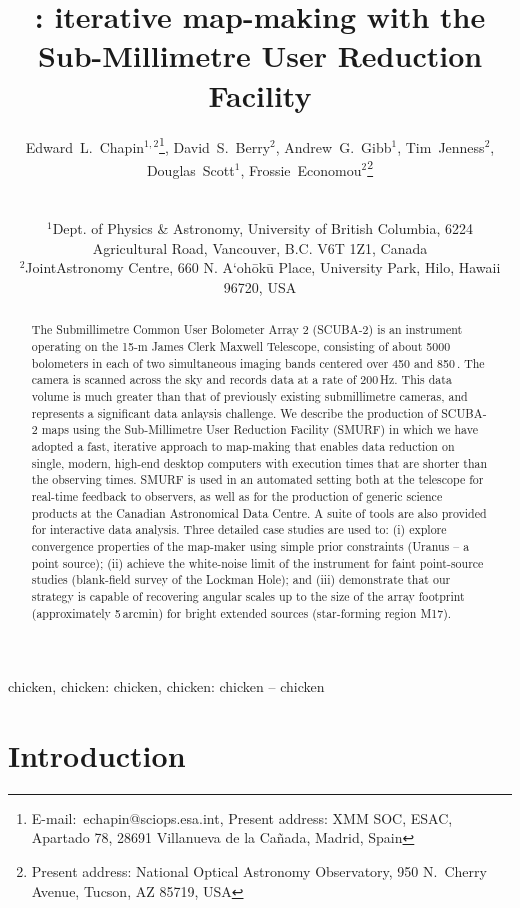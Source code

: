 \documentclass[useAMS,usenatbib,nofootinbib]{mn2e}
\title[\scuba: iterative map-making with SMURF]{\scuba: iterative map-making
with the Sub-Millimetre User Reduction Facility}
\author[Edward~L.~Chapin~et~al.]{
  \parbox[t]{\textwidth}{
    Edward~L.~Chapin$^{1,2}$\thanks{E-mail:~echapin@sciops.esa.int,
      Present address: XMM SOC, ESAC, Apartado 78, 28691 Villanueva de
      la Ca\~nada, Madrid, Spain},
    David~S.~Berry$^{2}$,
    Andrew~G.~Gibb$^{1}$,
    Tim~Jenness$^{2}$,
    Douglas~Scott$^{1}$,
    Frossie~Economou$^2$\thanks{Present address: National Optical
      Astronomy Observatory, 950 N.\ Cherry Avenue, Tucson, AZ 85719, USA}
  }
  \\
  \\
  $^{1}$Dept. of Physics \& Astronomy, University of British Columbia,
  6224 Agricultural Road, Vancouver, B.C. V6T 1Z1, Canada\\
  $^{2}$JointAstronomy Centre, 660 N. A`oh\={o}k\={u} Place, University
  Park, Hilo, Hawaii 96720, USA}
\newcommand{\scuba}{SCUBA-2}
\begin{document}
\label{firstpage}

\maketitle

\begin{abstract}
  The Submillimetre Common User Bolometer Array 2 (\scuba) is an
  instrument operating on the 15-m James Clerk Maxwell Telescope,
  consisting of about 5000 bolometers in each of two simultaneous
  imaging bands centered over 450 and 850\,\micron. The camera is
  scanned across the sky and records data at a rate of 200\,Hz. This
  data volume is much greater than that of previously existing
  submillimetre cameras, and represents a significant data anlaysis
  challenge. We describe the production of SCUBA-2 maps using the
  Sub-Millimetre User Reduction Facility (SMURF) in which we have
  adopted a fast, iterative approach to map-making that enables data
  reduction on single, modern, high-end desktop computers with
  execution times that are shorter than the observing times.  SMURF is
  used in an automated setting both at the telescope for real-time
  feedback to observers, as well as for the production of generic
  science products at the Canadian Astronomical Data Centre. A suite
  of tools are also provided for interactive data analysis.  Three
  detailed case studies are used to: (i) explore convergence
  properties of the map-maker using simple prior constraints (Uranus
  -- a point source); (ii) achieve the white-noise limit of the
  instrument for faint point-source studies (blank-field survey of the
  Lockman Hole); and (iii) demonstrate that our strategy is capable of
  recovering angular scales up to the size of the array footprint
  (approximately 5\,arcmin) for bright extended sources (star-forming
  region M17).
\end{abstract}


\begin{keywords}
chicken, chicken: chicken, chicken: chicken -- chicken
\end{keywords}

\section{Introduction}
\label{sec:intro}

\end{document}
